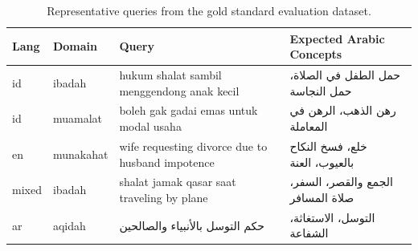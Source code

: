 \documentclass[preprint,12pt,numbers]{elsarticle}
\newcommand{\ar}[1]{{\arabicfont #1}}
\begin{document}
\begin{table}[t]
\centering
\caption{Representative queries from the gold standard evaluation dataset.}
\label{tab:query-examples}
\small
\begin{tabular}{llp{5cm}p{4.5cm}}
\toprule
Lang & Domain & Query & Expected Arabic Concepts \\
\midrule
id & ibadah & hukum shalat sambil menggendong anak kecil & \ar{حمل الطفل في الصلاة، حمل النجاسة} \\
id & muamalat & boleh gak gadai emas untuk modal usaha & \ar{رهن الذهب، الرهن في المعاملة} \\
en & munakahat & wife requesting divorce due to husband impotence & \ar{خلع، فسخ النكاح بالعيوب، العنة} \\
mixed & ibadah & shalat jamak qasar saat traveling by plane & \ar{الجمع والقصر، السفر، صلاة المسافر} \\
ar & aqidah & \ar{حكم التوسل بالأنبياء والصالحين} & \ar{التوسل، الاستغاثة، الشفاعة} \\
\bottomrule
\end{tabular}
\end{table}
\end{document}
